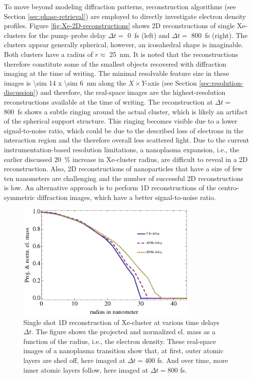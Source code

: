 To move beyond modeling diffraction patterns, reconstruction algorithms (see Section \ref{sec:phase-retrieval}) are employed to directly investigate electron density profiles. Figure \ref{fig:Xe-2D-reconstructions} shows 2D reconstructions of single Xe-clusters for the pump--probe delay $\Delta t =$ \SI{0}{\femto\second} (left) and $\Delta t=$ \SI{800}{\femto\second} (right). The clusters appear generally spherical, however, an icosahedral shape is imaginable. Both clusters have a radius of $r\approx$ \SI{25}{\nano\meter}. It is noted that the reconstructions therefore constitute some of the smallest objects recovered with diffraction imaging at the time of writing. The minimal resolvable feature size in these images is \SI{\sim 14 x \sim 6}{\nano\meter} along the $X \times Y$-axis (see Section \ref{sec:resolution-discussion}) and therefore, the real-space images are the highest-resolution reconstructions available at the time of writing. The reconstruction at $\Delta t=$ \SI{800}{\femto\second} shows a subtle ringing around the actual cluster, which is likely an artifact of the spherical support structure. This ringing becomes visible due to a lower signal-to-noise ratio, which could be due to the described loss of electrons in the interaction region and the therefore overall less scattered light. Due to the current instrumentation-based resolution limitations, a nanoplasma expansion, i.e., the earlier discussed \SI{20}{\percent} increase in Xe-cluster radius, are difficult to reveal in a 2D reconstruction. Also, 2D reconstructions of nanoparticles that have a size of few ten nanometers are challenging and the number of successful 2D reconstructions is low. An alternative approach is to perform 1D reconstructions of the centro-symmetric diffraction images, which have a better signal-to-noise ratio.\\[1\baselineskip]
\begin{figure}
	\centering
		\includegraphics[width=0.80\textwidth]{images/results/Xe-reconstructions.eps}
	\caption[Single-shot 1D reconstruction of \SI{\sim 30}{\nano\meter} radius Xe-cluster]{Single shot 1D reconstruction of Xe-cluster at various time delays $\Delta t$. The figure shows the projected and normalized el. mass as a function of the radius, i.e., the electron density. These real-space images of a nanoplasma transition show that, at first, outer atomic layers are shed off, here imaged at $\Delta t=400$ fs. And over time, more inner atomic layers follow, here imaged at $\Delta t= 800$ fs.}
	\label{fig:Xe-reconstructions}
\end{figure}

